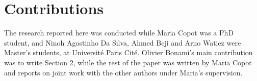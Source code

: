 \documentclass[output=paper,colorlinks,citecolor=brown]{langscibook}
\begin{document}
\section*{Contributions}
The research reported here was conducted while Maria Copot was a PhD student, and Ninoh Agostinho Da Silva, Ahmed Beji and Arno Watiez were Master's students, at Université Paris Cité. Olivier Bonami's main contribution was to write Section 2, while the rest of the paper was written by Maria Copot and reports on joint work with the other authors under Maria's supervision.


{\sloppy\printbibliography[heading=subbibliography,notkeyword=this]}
\end{document}
